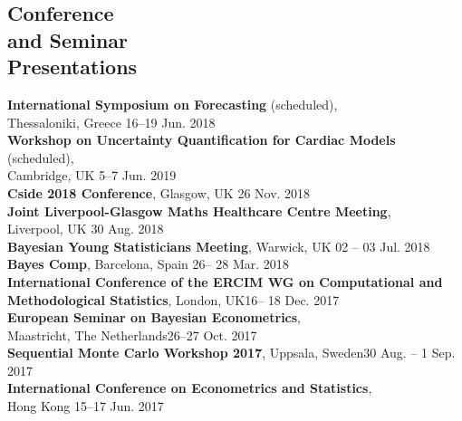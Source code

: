 \documentclass[margin,line]{resume}
\begin{document}
\begin{resume}
\section{\mysidestyle Conference \\and Seminar \\Presentations} 
	\textbf{ International Symposium on Forecasting} (scheduled),\\
	Thessaloniki, Greece \hfill 16--19 Jun. 2018 \vspace{1mm} \\	
	\textbf{Workshop on Uncertainty Quantification for Cardiac Models} (scheduled),\\
	Cambridge, UK \hfill 5--7 Jun. 2019 \vspace{1mm} \\		
	\textbf{Cside 2018 Conference}, Glasgow, UK \hfill 26 Nov. 2018 \vspace{1mm} \\
	\textbf{ Joint Liverpool-Glasgow Maths Healthcare Centre Meeting},\\
	Liverpool, UK \hfill 30 Aug. 2018 \vspace{1mm} \\	
	\textbf{ Bayesian Young Statisticians Meeting}, Warwick, UK \hfill 02 -- 03 Jul. 2018 \vspace{1mm} \\
	\textbf{ Bayes Comp}, Barcelona, Spain \hfill 26-- 28 Mar. 2018 \vspace{1mm} \\
	\textbf{ International Conference of the ERCIM WG on Computational and}\\
	\textbf{Methodological Statistics}, London, UK\hfill 16-- 18 Dec. 2017 \vspace{1mm} \\ 	
	\textbf{ European Seminar on Bayesian Econometrics},\\
	 Maastricht, The Netherlands\hfill 26--27 Oct. 2017 \vspace{1mm} \\ 
	\textbf{Sequential Monte Carlo Workshop 2017}, Uppsala, Sweden\hfill 30 Aug. -- 1 Sep. 2017 \vspace{1mm} \\ 
	\textbf{ International Conference on Econometrics and Statistics},\\ Hong Kong \hfill 15--17 Jun. 2017 \vspace{1mm} \\ 

\end{resume}
\end{document}
